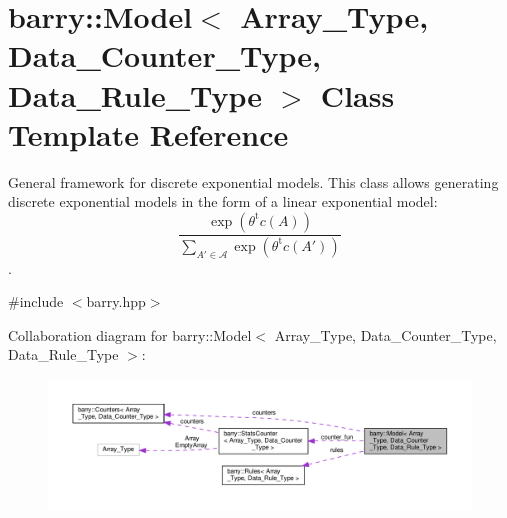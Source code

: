 \hypertarget{classbarry_1_1_model}{}\section{barry\+:\+:Model$<$ Array\+\_\+\+Type, Data\+\_\+\+Counter\+\_\+\+Type, Data\+\_\+\+Rule\+\_\+\+Type $>$ Class Template Reference}
\label{classbarry_1_1_model}


General framework for discrete exponential models. This class allows generating discrete exponential models in the form of a linear exponential model\+: \[ \frac{ \exp{\left(\theta^{\mbox{t}}c(A)\right)} }{ \sum_{A'\in \mathcal{A}}\exp{\left(\theta^{\mbox{t}}c(A')\right)} } \].  




{\ttfamily \#include $<$barry.\+hpp$>$}



Collaboration diagram for barry\+:\+:Model$<$ Array\+\_\+\+Type, Data\+\_\+\+Counter\+\_\+\+Type, Data\+\_\+\+Rule\+\_\+\+Type $>$\+:\nopagebreak
\begin{figure}[H]
\begin{center}
\leavevmode
\includegraphics[width=350pt]{classbarry_1_1_model__coll__graph}
\end{center}
\end{figure}
